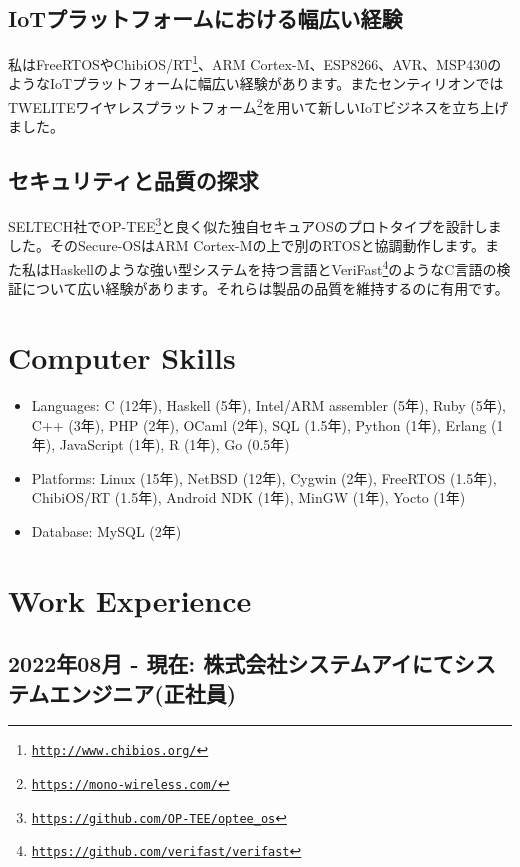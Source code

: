 \documentclass[letterpaper]{article}
\begin{document}
\subsection*{IoTプラットフォームにおける幅広い経験}

私はFreeRTOSやChibiOS/RT\footnote{\href{http://www.chibios.org/}{\tt http://www.chibios.org/}}、ARM Cortex-M、ESP8266、AVR、MSP430のようなIoTプラットフォームに幅広い経験があります。またセンティリオンではTWELITEワイヤレスプラットフォーム\footnote{\href{https://mono-wireless.com/}{\tt https://mono-wireless.com/}}を用いて新しいIoTビジネスを立ち上げました。

\subsection*{セキュリティと品質の探求}

SELTECH社でOP-TEE\footnote{\href{https://github.com/OP-TEE/optee\_os}{\tt https://github.com/OP-TEE/optee\_os}}と良く似た独自セキュアOSのプロトタイプを設計しました。そのSecure-OSはARM Cortex-Mの上で別のRTOSと協調動作します。また私はHaskellのような強い型システムを持つ言語とVeriFast\footnote{\href{https://github.com/verifast/verifast}{\tt https://github.com/verifast/verifast}}のようなC言語の検証について広い経験があります。それらは製品の品質を維持するのに有用です。

\section*{Computer Skills}

\begin{itemize}
  \item Languages: C (12年), Haskell (5年), Intel/ARM assembler (5年), Ruby (5年), C++ (3年), PHP (2年), OCaml (2年), SQL (1.5年), Python (1年), Erlang (1年), JavaScript (1年), R (1年), Go (0.5年)
  \item Platforms: Linux (15年), NetBSD (12年), Cygwin (2年), FreeRTOS (1.5年), ChibiOS/RT (1.5年), Android NDK (1年), MinGW (1年), Yocto (1年)
  \item Database: MySQL (2年)
\end{itemize}

\newpage

\section*{Work Experience}

\subsection*{2022年08月 - 現在: 株式会社システムアイにてシステムエンジニア(正社員)}
\end{document}
